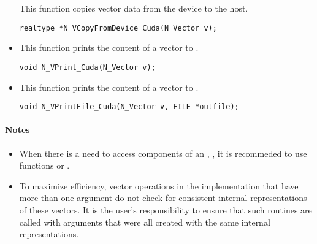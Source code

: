 \begin{itemize}
 This function copies vector data from the device to the host.

 \verb|realtype *N_VCopyFromDevice_Cuda(N_Vector v);|



\item {}

  This function prints the content of a {\cuda} vector to .

  \verb|void N_VPrint_Cuda(N_Vector v);|


\item {}

  This function prints the content of a {\cuda} vector to .

  \verb|void N_VPrintFile_Cuda(N_Vector v, FILE *outfile);|


\end{itemize}
\paragraph{\bf Notes}

\begin{itemize}

\item
  When there is a need to access components of an , ,
  it is recommeded to use functions  or
  .


\item
  {\warn}To maximize efficiency, vector operations in the {\nveccuda} implementation
  that have more than one  argument do not check for
  consistent internal representations of these vectors. It is the user's
  responsibility to ensure that such routines are called with 
  arguments that were all created with the same internal representations.

\end{itemize}

